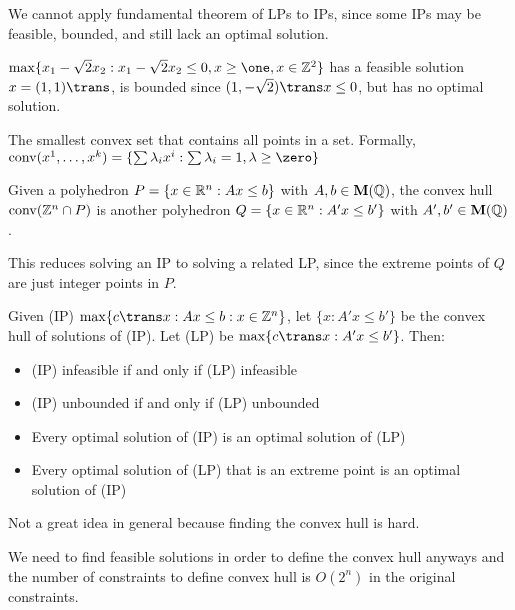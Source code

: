We cannot apply fundamental theorem of LPs to IPs, since some IPs may be
feasible, bounded, and still lack an optimal solution.

\begin{example}
  $\max\{x_1-\sqrt2x_2 : x_1-\sqrt2x_2 \leq 0, x \geq \one, x \in \Z^2\}$
  has a feasible solution $x = (1,1)\trans$,
  is bounded since $(1,-\sqrt2)\trans x \leq 0$,
  but has no optimal solution.
\end{example}

\begin{defn}
  The smallest convex set that contains all
  points in a set. Formally,
  $\operatorname{conv}(x^1,\dotsc,x^k) = \{\sum \lambda_i x^i : \sum \lambda_i = 1, \lambda \geq \zero \}$
\end{defn}

\begin{theorem}
  Given a polyhedron $P = \{x \in \mathbb{R}^n : Ax \leq b\}$ with $A,b \in \textbf{M}(\mathbb{Q})$,
  the convex hull $\operatorname{conv}(\mathbb{Z}^n \cap P)$ is another polyhedron
  $Q = \{x \in \mathbb{R}^n : A'x \leq b'\}$ with $A',b' \in \textbf{M}(\mathbb{Q})$.
\end{theorem}

This reduces solving an IP to solving a related LP, since the
extreme points of $Q$ are just integer points in $P$.

\begin{theorem}
  Given (IP) $\max\{c\trans x : Ax \leq b : x \in \Z^n\}$,
  let $\{x : A' x \leq b'\}$ be the convex hull of solutions of (IP).
  Let (LP) be $\max\{c\trans x : A'x \leq b'\}$. Then:
  \begin{itemize}[nosep]
    \item (IP) infeasible if and only if (LP) infeasible
    \item (IP) unbounded if and only if (LP) unbounded
    \item Every optimal solution of (IP) is an optimal solution of (LP)
    \item Every optimal solution of (LP) that is an extreme point is an optimal solution of (IP)
  \end{itemize}
\end{theorem}

Not a great idea in general because finding the convex hull is hard.

We need to find feasible solutions in order to define the convex hull anyways
and the number of constraints to define convex hull is $O(2^n)$ in the original constraints.

